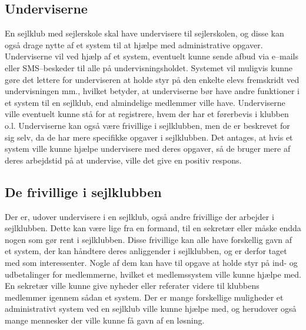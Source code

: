 

\subsection{Underviserne}

En sejlklub med sejlerskole skal have undervisere til sejlerskolen, og disse kan også drage nytte af et system til at hjælpe med administrative opgaver. 
Underviserne vil ved hjælp af et system, eventuelt kunne sende afbud via e--mails eller SMS--beskeder til alle på undervisningsholdet. 
Systemet vil muligvis kunne gøre det lettere for underviseren at holde styr på den enkelte elevs fremskridt ved undervisningen mm., hvilket betyder, at underviserne bør have andre funktioner i et system til en sejlklub, end almindelige medlemmer ville have.
Underviserne ville eventuelt kunne stå for at registrere, hvem der har et førerbevis i klubben o.l.
Underviserne kan også være frivillige i sejlklubben, men de er beskrevet for sig selv, da de har mere specifikke opgaver i sejlklubben.
Det antages, at hvis et system ville kunne hjælpe undervisere med deres opgaver, så de bruger mere af deres arbejdstid på at undervise, ville det give en positiv respons. 


\subsection{De frivillige i sejlklubben}

Der er, udover undervisere i en sejlklub, også andre frivillige der arbejder i sejlklubben.
Dette kan være lige fra en formand, til en sekretær eller måske endda nogen som gør rent i sejlklubben. 
Disse frivillige kan alle have forskellig gavn af et system, der kan håndtere deres anliggender i sejlklubben, og er derfor taget med som interessenter. 
Nogle af dem kan have til opgave at holde styr på ind- og udbetalinger for medlemmerne, hvilket et medlemssystem ville kunne hjælpe med. 
En sekretær ville kunne give nyheder eller referater videre til klubbens medlemmer igennem sådan et system. 
Der er mange forskellige muligheder et administrativt system ved en sejlklub ville kunne hjælpe med, og herudover også mange mennesker der ville kunne få gavn af en løsning. 


